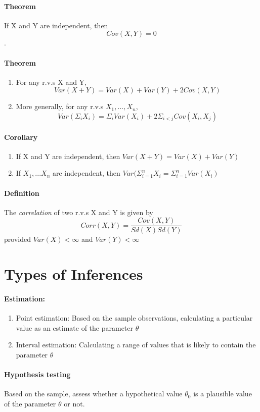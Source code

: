 \documentclass[11pt]{article}
\newcommand{\ti}[1]{\textit{#1}}
\begin{document}
\paragraph{Theorem} If X and Y are independent, then $$Cov(X,Y) = 0$$.
\paragraph{Theorem} 
\begin{enumerate}
\item For any r.v.s X and Y,
$$Var(X+Y) = Var(X) + Var(Y) + 2Cov(X,Y)$$
\item More generally, for any r.v.s $X_1,...,X_n$,$$Var(\Sigma_i X_i) = \Sigma_i Var(X_i) + 2\Sigma_{i < j}Cov(X_i,X_j)$$
\end{enumerate}
\paragraph{Corollary}
\begin{enumerate}
	\item If X and Y are independent, then $Var(X+Y) = Var(X) + Var(Y)$
	\item If $X_1,...X_n$ are independent, then $Var(\Sigma_{i=1}^n X_i = \Sigma_{i=1}^nVar(X_i)$
\end{enumerate}
\paragraph{Definition} The \ti{correlation} of two r.v.s X and Y is given by
$$Corr(X,Y) = \frac{Cov(X,Y)}{Sd(X)Sd(Y)}$$ 
provided $Var(X) < \infty$ and $Var(Y) < \infty$
\section{Types of Inferences}
\paragraph{Estimation:}
\begin{enumerate}
	\item Point estimation: Based on the sample observations, calculating a particular value as an estimate of the parameter $\theta$
	\item Interval estimation: Calculating a range of values that is likely to contain the parameter $\theta$
\end{enumerate}
\paragraph{Hypothesis testing} Based on the sample, assess whether a hypothetical value $\theta_0$ is a plausible value of the parameter $\theta$ or not.
\end{document}
